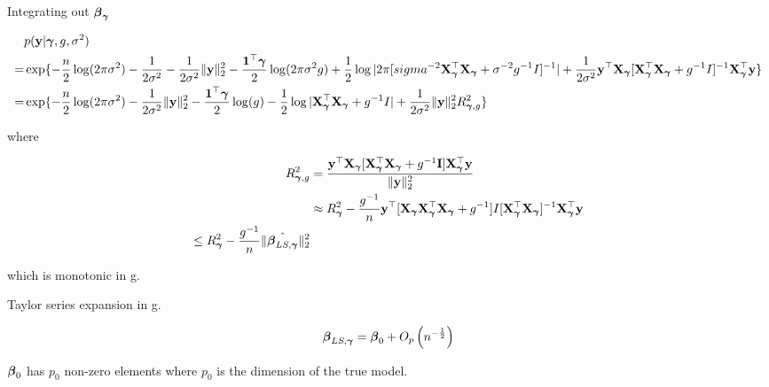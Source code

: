 \documentclass{amsart}
\begin{document}
Integrating out ${\boldsymbol \beta}_{\boldsymbol \gamma}$

\begin{align*}
&p({\bf y} | {\boldsymbol \gamma}, g, \sigma^2) \\
=& \exp\{-\frac{n}{2} \log(2 \pi \sigma^2) - \frac{1}{2 \sigma^2} - \frac{1}{2 \sigma^2} \|{\bf y}\|_2^2
				-\frac{{\bf 1}^\top {\boldsymbol\gamma}}{2} \log(2 \pi \sigma^2 g)
				+ \frac{1}{2} \log |2 \pi [sigma^{-2} {\bf X}_{\boldsymbol \gamma}^\top {\bf X}_{\boldsymbol \gamma} + \sigma^{-2} g^{-1} I]^{-1}|
				+ \frac{1}{2 \sigma^2} {\bf y}^\top {\bf X}_{\boldsymbol \gamma} [{\bf X}_{\boldsymbol \gamma}^\top {\bf X}_{\boldsymbol \gamma} + g^{-1} I]^{-1} {\bf X}_{\boldsymbol \gamma}^\top {\bf y}\} \\
=& \exp\{-\frac{n}{2} \log(2 \pi \sigma^2) - \frac{1}{2 \sigma^2} \|{\bf y}\|_2^2 - \frac{{\bf 1}^\top {\boldsymbol\gamma}}{2} \log(g)
				-\frac{1}{2} \log|{\bf X}_{\boldsymbol \gamma}^\top {\bf X}_{\boldsymbol \gamma} + g^{-1}I| + \frac{1}{2 \sigma^2} \|{\bf y}\|_2^2 R_{{\boldsymbol \gamma}, g}^2\}
\end{align*}

where

\begin{align*}
R_{{\boldsymbol \gamma}, g}^2 &= \frac{{\bf y}^\top {\bf X}_{\boldsymbol \gamma} [{\bf X}_{\boldsymbol \gamma}^\top {\bf X}_{\boldsymbol \gamma} + g^{-1} {\bf I}] {\bf X}_{\boldsymbol \gamma}^\top {\bf y}}{\|{\bf y}\|_2^2} \\
&\approx R_{\boldsymbol \gamma}^2 - \frac{g^{-1}}{n} {\bf y}^\top [{\bf X}_{\boldsymbol \gamma} {\bf X}_{\boldsymbol \gamma}^\top {\bf X}_{\boldsymbol \gamma} + g^{-1}] I [{\bf X}_{\boldsymbol \gamma}^\top {\bf X}_{\boldsymbol \gamma}]^{-1} {\bf X}_{\boldsymbol \gamma}^\top {\bf y} \\
\leq R_{\boldsymbol \gamma}^2 - \frac{g^{-1}}{n} \| \hat{{\boldsymbol \beta}_{LS, {\boldsymbol \gamma}}} \|_2^2
\end{align*}

which is monotonic in g.

Taylor series expansion in g.

\begin{equation*}
{\boldsymbol\beta}_{LS, {\boldsymbol \gamma}} = {\boldsymbol \beta}_0 + O_p\left(n^{-\frac{1}{2}}\right)
\end{equation*}

${\boldsymbol \beta}_0$ has $p_0$ non-zero elements where $p_0$ is the dimension of the true model.
\end{document}
